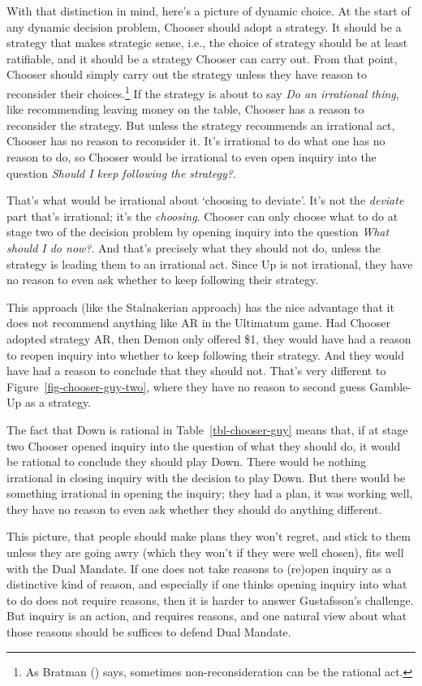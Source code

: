 \documentclass[
  10pt,
  letterpaper,
  DIV=11,
  numbers=noendperiod,
  twoside]{scrartcl}
\begin{document}
With that distinction in mind, here's a picture of dynamic choice. At
the start of any dynamic decision problem, Chooser should adopt a
strategy. It should be a strategy that makes strategic sense, i.e., the
choice of strategy should be at least ratifiable, and it should be a
strategy Chooser can carry out. From that point, Chooser should simply
carry out the strategy unless they have reason to reconsider their
choices.\footnote{As Bratman () says,
  sometimes non-reconsideration can be the rational act.} If the
strategy is about to say \emph{Do an irrational thing}, like
recommending leaving money on the table, Chooser has a reason to
reconsider the strategy. But unless the strategy recommends an
irrational act, Chooser has no reason to reconsider it. It's irrational
to do what one has no reason to do, so Chooser would be irrational to
even open inquiry into the question \emph{Should I keep following the
strategy?}.

That's what would be irrational about `choosing to deviate'. It's not
the \emph{deviate} part that's irrational; it's the \emph{choosing}.
Chooser can only choose what to do at stage two of the decision problem
by opening inquiry into the question \emph{What should I do now?}. And
that's precisely what they should not do, unless the strategy is leading
them to an irrational act. Since Up is not irrational, they have no
reason to even ask whether to keep following their strategy.

This approach (like the Stalnakerian approach) has the nice advantage
that it does not recommend anything like AR in the Ultimatum game. Had
Chooser adopted strategy AR, then Demon only offered \$1, they would
have had a reason to reopen inquiry into whether to keep following their
strategy. And they would have had a reason to conclude that they should
not. That's very different to Figure~\ref{fig-chooser-guy-two}, where
they have no reason to second guess Gamble-Up as a strategy.

The fact that Down is rational in Table~\ref{tbl-chooser-guy} means
that, if at stage two Chooser opened inquiry into the question of what
they should do, it would be rational to conclude they should play Down.
There would be nothing irrational in closing inquiry with the decision
to play Down. But there would be something irrational in opening the
inquiry; they had a plan, it was working well, they have no reason to
even ask whether they should do anything different.

This picture, that people should make plans they won't regret, and stick
to them unless they are going awry (which they won't if they were well
chosen), fits well with the Dual Mandate. If one does not take reasons
to (re)open inquiry as a distinctive kind of reason, and especially if
one thinks opening inquiry into what to do does not require reasons,
then it is harder to answer Gustafsson's challenge. But inquiry is an
action, and requires reasons, and one natural view about what those
reasons should be suffices to defend Dual Mandate.
\end{document}
